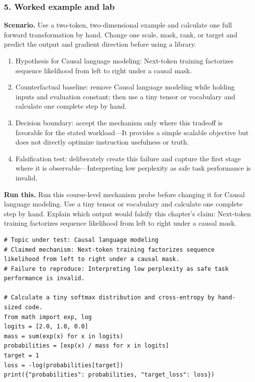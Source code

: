\subsubsection*{5. Worked example and lab}
\textbf{Scenario.} Use a two-token, two-dimensional example and calculate one full forward transformation by hand. Change one scale, mask, rank, or target and predict the output and gradient direction before using a library.
\begin{enumerate}
\item Hypothesis for Causal language modeling: Next-token training factorizes sequence likelihood from left to right under a causal mask.
\item Counterfactual baseline: remove Causal language modeling while holding inputs and evaluation constant; then use a tiny tensor or vocabulary and calculate one complete step by hand.
\item Decision boundary: accept the mechanism only where this tradeoff is favorable for the stated workload—It provides a simple scalable objective but does not directly optimize instruction usefulness or truth.
\item Falsification test: deliberately create this failure and capture the first stage where it is observable—Interpreting low perplexity as safe task performance is invalid.
\end{enumerate}
\textbf{Run this.} Run this course-level mechanism probe before changing it for Causal language modeling. Use a tiny tensor or vocabulary and calculate one complete step by hand. Explain which output would falsify this chapter's claim: Next-token training factorizes sequence likelihood from left to right under a causal mask.
\begin{Verbatim}[fontsize=\scriptsize]
# Topic under test: Causal language modeling
# Claimed mechanism: Next-token training factorizes sequence likelihood from left to right under a causal mask.
# Failure to reproduce: Interpreting low perplexity as safe task performance is invalid.

# Calculate a tiny softmax distribution and cross-entropy by hand-sized code.
from math import exp, log
logits = [2.0, 1.0, 0.0]
mass = sum(exp(x) for x in logits)
probabilities = [exp(x) / mass for x in logits]
target = 1
loss = -log(probabilities[target])
print({"probabilities": probabilities, "target_loss": loss})
\end{Verbatim}
